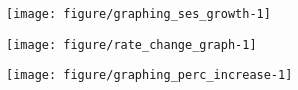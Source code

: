 \documentclass[11pt, a4paper]{article}\usepackage[]{graphicx}\usepackage[]{color}
\begin{document}
{\centering \texttt{[image: figure/graphing\_ses\_growth-1]} 

}










{\centering \texttt{[image: figure/rate\_change\_graph-1]} 

}








{\centering \texttt{[image: figure/graphing\_perc\_increase-1]} 

}
\end{document}
